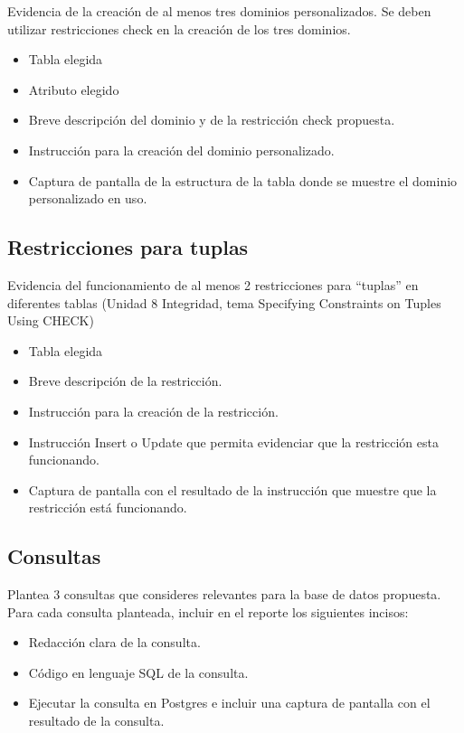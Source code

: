 Evidencia de la creación de al menos tres dominios personalizados. Se deben utilizar restricciones check en la creación de los tres dominios.
\begin{itemize}
    \item Tabla elegida
    \item Atributo elegido
    \item Breve descripción del dominio y de la restricción check propuesta.
    \item Instrucción para la creación del dominio personalizado.
    \item Captura de pantalla de la estructura de la tabla donde se muestre el dominio personalizado
    en uso.
\end{itemize}



\subsection{Restricciones para tuplas}

Evidencia del funcionamiento de al menos 2 restricciones para “tuplas” en diferentes tablas (Unidad 8 Integridad, tema Specifying Constraints on Tuples Using CHECK)
\begin{itemize}
    \item Tabla elegida
    \item Breve descripción de la restricción.
    \item Instrucción para la creación de la restricción.
    \item Instrucción Insert o Update que permita evidenciar que la restricción esta funcionando.
    \item Captura de pantalla con el resultado de la instrucción que muestre que la restricción está
    funcionando.
\end{itemize}



\subsection{Consultas}

Plantea 3 consultas que consideres relevantes para la base de datos propuesta. Para cada consulta planteada, incluir en el reporte los siguientes incisos:
\begin{itemize}
    \item Redacción clara de la consulta.
    \item Código en lenguaje SQL de la consulta.
    \item Ejecutar la consulta en Postgres e incluir una captura de pantalla con el resultado de la
    consulta.
\end{itemize}

